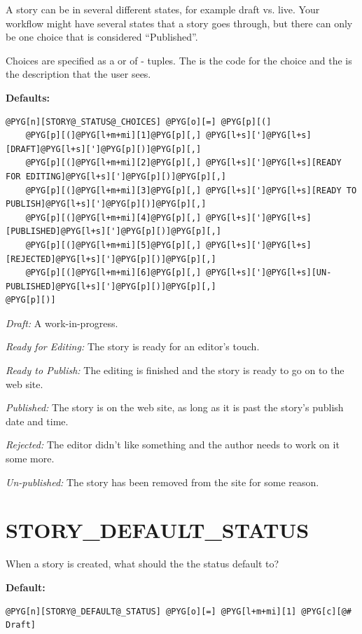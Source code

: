 \documentclass[letterpaper,10pt,english]{manual}
\begin{document}
A story can be in several different states, for example draft vs. live. Your workflow might have several states that a story goes through, but there can only be one choice that is considered ``Published''.

Choices are specified as a  or  of  -  tuples. The  is the code for the choice and the  is the description that the user sees.

\textbf{Defaults:}

\begin{Verbatim}[commandchars=@\[\]]
@PYG[n][STORY@_STATUS@_CHOICES] @PYG[o][=] @PYG[p][(]
    @PYG[p][(]@PYG[l+m+mi][1]@PYG[p][,] @PYG[l+s][']@PYG[l+s][DRAFT]@PYG[l+s][']@PYG[p][)]@PYG[p][,]
    @PYG[p][(]@PYG[l+m+mi][2]@PYG[p][,] @PYG[l+s][']@PYG[l+s][READY FOR EDITING]@PYG[l+s][']@PYG[p][)]@PYG[p][,]
    @PYG[p][(]@PYG[l+m+mi][3]@PYG[p][,] @PYG[l+s][']@PYG[l+s][READY TO PUBLISH]@PYG[l+s][']@PYG[p][)]@PYG[p][,]
    @PYG[p][(]@PYG[l+m+mi][4]@PYG[p][,] @PYG[l+s][']@PYG[l+s][PUBLISHED]@PYG[l+s][']@PYG[p][)]@PYG[p][,]
    @PYG[p][(]@PYG[l+m+mi][5]@PYG[p][,] @PYG[l+s][']@PYG[l+s][REJECTED]@PYG[l+s][']@PYG[p][)]@PYG[p][,]
    @PYG[p][(]@PYG[l+m+mi][6]@PYG[p][,] @PYG[l+s][']@PYG[l+s][UN-PUBLISHED]@PYG[l+s][']@PYG[p][)]@PYG[p][,]
@PYG[p][)]
\end{Verbatim}

\emph{Draft:} A work-in-progress.

\emph{Ready for Editing:} The story is ready for an editor's touch.

\emph{Ready to Publish:} The editing is finished and the story is ready to go on to the web site.

\emph{Published:} The story is on the web site, as long as it is past the story's publish date and time.

\emph{Rejected:} The editor didn't like something and the author needs to work on it some more.

\emph{Un-published:} The story has been removed from the site for some reason.
\hypertarget{story-default-status}{}

\section{STORY\_DEFAULT\_STATUS}

When a story is created, what should the the status default to?

\textbf{Default:}

\begin{Verbatim}[commandchars=@\[\]]
@PYG[n][STORY@_DEFAULT@_STATUS] @PYG[o][=] @PYG[l+m+mi][1] @PYG[c][@# Draft]
\end{Verbatim}
\hypertarget{story-published-status}{}
\end{document}
